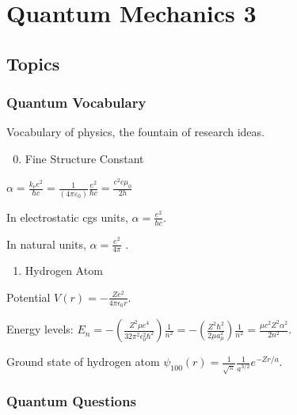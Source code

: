 \documentclass[letterpaper,10pt,english]{sphinxmanual}
\begin{document}
\section{Quantum Mechanics 3}
\label{Quantum/QuantumMechanics3:quantum-mechanics-3}\label{Quantum/QuantumMechanics3::doc}

\subsection{Topics}
\label{Quantum/QuantumMechanics3:topics}

\subsubsection{Quantum Vocabulary}
\label{Quantum/vocabulary::doc}\label{Quantum/vocabulary:quantum-vocabulary}
Vocabulary of physics, the fountain of research ideas.
\begin{enumerate}
\setcounter{enumi}{-1}
\item {} 
Fine Structure Constant

\end{enumerate}

\(\alpha = \frac{k_\mathrm{e} e^2}{\hbar c} = \frac{1}{(4 \pi \varepsilon_0)} \frac{e^2}{\hbar c} = \frac{e^2 c \mu_0}{2 h}\)

In electrostatic cgs units, \(\alpha = \frac{e^2}{\hbar c}\).

In natural units, \(\alpha = \frac{e^2}{4 \pi}\) .
\begin{enumerate}
\item {} 
Hydrogen Atom

\end{enumerate}

Potential \(V(r) = -\frac{Z e^2}{4\pi \epsilon_0 r}\).

Energy levels: \(E_{n} = -\left(\frac{Z^2 \mu e^4}{32 \pi^2\epsilon_0^2\hbar^2}\right)\frac{1}{n^2} = -\left(\frac{Z^2\hbar^2}{2\mu a_{\mu}^2}\right)\frac{1}{n^2} = \frac{\mu c^2Z^2\alpha^2}{2n^2}.\)

Ground state of hydrogen atom \(\psi_{100}(r)=\frac{1}{\sqrt{\pi}}\frac{1}{a^{3/2}} e^{-Z r/a}\).


\subsubsection{Quantum Questions}
\label{Quantum/questions::doc}\label{Quantum/questions:quantum-questions}
\end{document}
